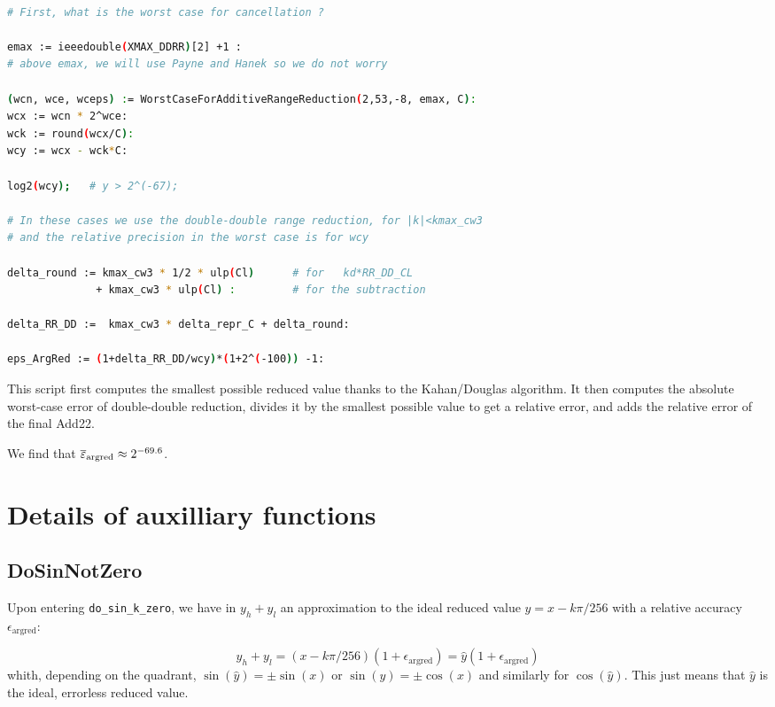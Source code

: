 \begin{lstlisting}[caption={Maple script computing the relative error bound of range reduction}, firstnumber=1,
  language={sh}, numbers=none]% of course it's maple
%Skip a line here, I don't know why, otherwise latex eats the first line

# First, what is the worst case for cancellation ?

emax := ieeedouble(XMAX_DDRR)[2] +1 :
# above emax, we will use Payne and Hanek so we do not worry

(wcn, wce, wceps) := WorstCaseForAdditiveRangeReduction(2,53,-8, emax, C):
wcx := wcn * 2^wce:
wck := round(wcx/C):
wcy := wcx - wck*C:

log2(wcy);   # y > 2^(-67);

# In these cases we use the double-double range reduction, for |k|<kmax_cw3
# and the relative precision in the worst case is for wcy

delta_round := kmax_cw3 * 1/2 * ulp(Cl)      # for   kd*RR_DD_CL
              + kmax_cw3 * ulp(Cl) :         # for the subtraction

delta_RR_DD :=  kmax_cw3 * delta_repr_C + delta_round:

eps_ArgRed := (1+delta_RR_DD/wcy)*(1+2^(-100)) -1:
\end{lstlisting}

This script first computes the smallest possible reduced value thanks
to the Kahan/Douglas algorithm. It then computes the absolute
worst-case error of double-double reduction, divides it by the
smallest possible value to get a relative error, and adds the relative
error of the final Add22.

 We find that
${\overline{\varepsilon}}_{\mathrm{argred}} \approx 2^{-69.6}$.




\section{Details of auxilliary functions
  \label{trigo:auxilliary}}

\subsection{DoSinNotZero \label{dosinzero}}
Upon entering  \texttt{do\_sin\_k\_zero}, we have in
$y_h+y_l$ an approximation to the ideal reduced value
$\hat{y}=x-k\pi/256$ with a relative accuracy $\epsilon_{\mathrm{argred}}$:

\begin{equation}
  y_h+y_l = (x-k\pi/256)(1+\epsilon_{\mathrm{argred}}) 
  = \hat{y}(1+\epsilon_{\mathrm{argred}})
  \label{eq:sinargrederror1}
\end{equation}
whith, depending on the quadrant, $\sin(\hat{y}) = \pm\sin(x)$ or
$\sin(\hat{y}) = \pm\cos(x)$ and similarly for $\cos(\hat{y})$. This
just means that $\hat{y}$ is the ideal, errorless reduced value.

